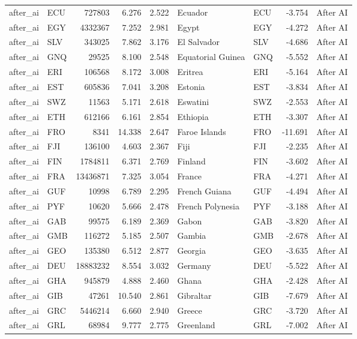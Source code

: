 \begin{tabular}{llrrrllrl}
after\_ai & ECU & 727803 & 6.276 & 2.522 & Ecuador & ECU & -3.754 & After AI \\
after\_ai & EGY & 4332367 & 7.252 & 2.981 & Egypt & EGY & -4.272 & After AI \\
after\_ai & SLV & 343025 & 7.862 & 3.176 & El Salvador & SLV & -4.686 & After AI \\
after\_ai & GNQ & 29525 & 8.100 & 2.548 & Equatorial Guinea & GNQ & -5.552 & After AI \\
after\_ai & ERI & 106568 & 8.172 & 3.008 & Eritrea & ERI & -5.164 & After AI \\
after\_ai & EST & 605836 & 7.041 & 3.208 & Estonia & EST & -3.834 & After AI \\
after\_ai & SWZ & 11563 & 5.171 & 2.618 & Eswatini & SWZ & -2.553 & After AI \\
after\_ai & ETH & 612166 & 6.161 & 2.854 & Ethiopia & ETH & -3.307 & After AI \\
after\_ai & FRO & 8341 & 14.338 & 2.647 & Faroe Islands & FRO & -11.691 & After AI \\
after\_ai & FJI & 136100 & 4.603 & 2.367 & Fiji & FJI & -2.235 & After AI \\
after\_ai & FIN & 1784811 & 6.371 & 2.769 & Finland & FIN & -3.602 & After AI \\
after\_ai & FRA & 13436871 & 7.325 & 3.054 & France & FRA & -4.271 & After AI \\
after\_ai & GUF & 10998 & 6.789 & 2.295 & French Guiana & GUF & -4.494 & After AI \\
after\_ai & PYF & 10620 & 5.666 & 2.478 & French Polynesia & PYF & -3.188 & After AI \\
after\_ai & GAB & 99575 & 6.189 & 2.369 & Gabon & GAB & -3.820 & After AI \\
after\_ai & GMB & 116272 & 5.185 & 2.507 & Gambia & GMB & -2.678 & After AI \\
after\_ai & GEO & 135380 & 6.512 & 2.877 & Georgia & GEO & -3.635 & After AI \\
after\_ai & DEU & 18883232 & 8.554 & 3.032 & Germany & DEU & -5.522 & After AI \\
after\_ai & GHA & 945879 & 4.888 & 2.460 & Ghana & GHA & -2.428 & After AI \\
after\_ai & GIB & 47261 & 10.540 & 2.861 & Gibraltar & GIB & -7.679 & After AI \\
after\_ai & GRC & 5446214 & 6.660 & 2.940 & Greece & GRC & -3.720 & After AI \\
after\_ai & GRL & 68984 & 9.777 & 2.775 & Greenland & GRL & -7.002 & After AI \\

\end{tabular}
